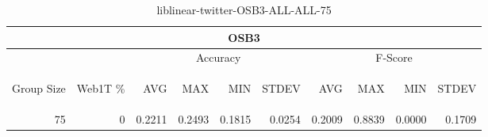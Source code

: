 \begin{center}
\begin{table}[htbp]
\begin{tabular}{ | r | r | r | r | r | r | r | r | r | r |}
\hline
\multicolumn{10}{|c|}{OSB3}\\
\hline
 & & \multicolumn{4}{|c|}{Accuracy} & \multicolumn{4}{|c|}{F-Score}\\ \cline{3-10}
\begin{sideways}Group Size\end{sideways} & \begin{sideways}Web1T \%\end{sideways} & \begin{sideways}AVG\end{sideways} & \begin{sideways}MAX\end{sideways} & \begin{sideways}MIN\end{sideways} & \begin{sideways}STDEV\end{sideways} & \begin{sideways}AVG\end{sideways} & \begin{sideways}MAX\end{sideways} & \begin{sideways}MIN\end{sideways} & \begin{sideways}STDEV\end{sideways}\\
\hline
\multirow{0}{*}{75}
 & 0 & 0.2211 & 0.2493 & 0.1815 & 0.0254 & 0.2009 & 0.8839 & 0.0000 & 0.1709\\ \cline{2-10}
\hline
\end{tabular}
\caption{liblinear-twitter-OSB3-ALL-ALL-75}
\label{table:liblinear-twitter-OSB3-ALL-ALL-75}
\end{table}
\end{center}


